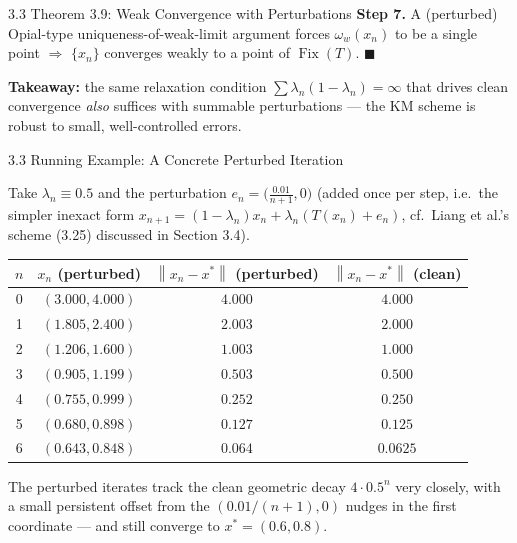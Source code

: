 \documentclass[aspectratio=169,10pt]{beamer}
\newcommand{\Fix}{\operatorname{Fix}}
\newcommand{\norm}[1]{\left\|#1\right\|}
\begin{document}
\begin{frame}[allowframebreaks]{3.3 Theorem 3.9: Weak Convergence with Perturbations}
  \textbf{Step 7.} A (perturbed) Opial-type uniqueness-of-weak-limit
  argument forces $\omega_w(x_n)$ to be a single point $\Rightarrow$
  $\{x_n\}$ converges weakly to a point of $\Fix(T)$. $\blacksquare$

  \textbf{Takeaway:} the same relaxation condition
  $\sum\lambda_n(1-\lambda_n)=\infty$ that drives clean convergence
  \emph{also} suffices with summable perturbations --- the KM scheme is
  robust to small, well-controlled errors.
\end{frame}

\begin{frame}[allowframebreaks]{3.3 Running Example: A Concrete Perturbed Iteration}

  Take $\lambda_n\equiv0.5$ and the perturbation
  $e_n=\bigl(\tfrac{0.01}{n+1},0\bigr)$ (added once per step, i.e.\ the
  simpler inexact form $x_{n+1}=(1-\lambda_n)x_n+\lambda_n(T(x_n)+e_n)$,
  cf.\ Liang et al.'s scheme (3.25) discussed in Section 3.4).

  \begin{center}
  \begin{tabular}{c c c c}
    \toprule
    $n$ & $x_n$ (perturbed) & $\norm{x_n-x^*}$ (perturbed) & $\norm{x_n-x^*}$ (clean) \\
    \midrule
    0 & $(3.000,4.000)$ & $4.000$ & $4.000$ \\
    1 & $(1.805,2.400)$ & $2.003$ & $2.000$ \\
    2 & $(1.206,1.600)$ & $1.003$ & $1.000$ \\
    3 & $(0.905,1.199)$ & $0.503$ & $0.500$ \\
    4 & $(0.755,0.999)$ & $0.252$ & $0.250$ \\
    5 & $(0.680,0.898)$ & $0.127$ & $0.125$ \\
    6 & $(0.643,0.848)$ & $0.064$ & $0.0625$ \\
    \bottomrule
  \end{tabular}
  \end{center}

  The perturbed iterates track the clean geometric decay
  $4\cdot0.5^n$ very closely, with a small persistent offset from the
  $(0.01/(n+1),0)$ nudges in the first coordinate --- and still
  converge to $x^*=(0.6,0.8)$.

  \framebreak


\end{frame}
\end{document}
